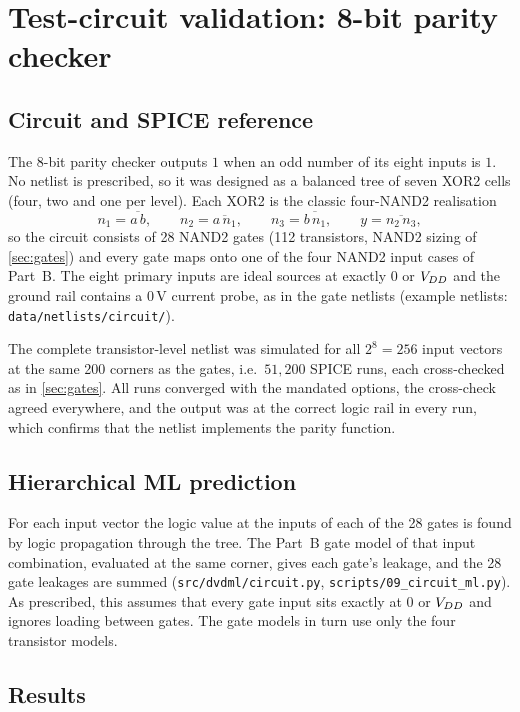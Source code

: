 \section{Test-circuit validation: 8-bit parity checker}\label{sec:circuit}

\subsection{Circuit and SPICE reference}
The 8-bit parity checker outputs $1$ when an odd number of its eight inputs is $1$. No netlist is prescribed, so it was designed as a balanced tree of
seven XOR2 cells (four, two and one per level). Each XOR2 is the classic four-NAND2 realisation
\[
  n_1=\overline{a\,b},\qquad n_2=\overline{a\,n_1},\qquad n_3=\overline{b\,n_1},\qquad y=\overline{n_2\,n_3},
\]
so the circuit consists of 28 NAND2 gates (112 transistors, NAND2 sizing of \cref{sec:gates}) and every gate maps onto one of the four NAND2 input
cases of Part~B. The eight primary inputs are ideal sources at exactly $0$ or $V_{DD}$ and the ground rail contains a 0\,V current probe, as in the
gate netlists (example netlists: \texttt{data/netlists/circuit/}).

The complete transistor-level netlist was simulated for all $2^8=256$ input vectors at the same 200 corners as the gates, i.e.\ $51{,}200$ SPICE runs,
each cross-checked as in \cref{sec:gates}. All runs converged with the mandated options, the cross-check agreed everywhere, and the output was at the
correct logic rail in every run, which confirms that the netlist implements the parity function.

\subsection{Hierarchical ML prediction}
For each input vector the logic value at the inputs of each of the 28 gates is found by logic propagation through the tree. The Part~B gate model of
that input combination, evaluated at the same corner, gives each gate's leakage, and the 28 gate leakages are summed
(\texttt{src/dvdml/circuit.py}, \texttt{scripts/09\_circuit\_ml.py}). As prescribed, this assumes that every gate input sits exactly at $0$ or $V_{DD}$
and ignores loading between gates. The gate models in turn use only the four transistor models.

\subsection{Results}



